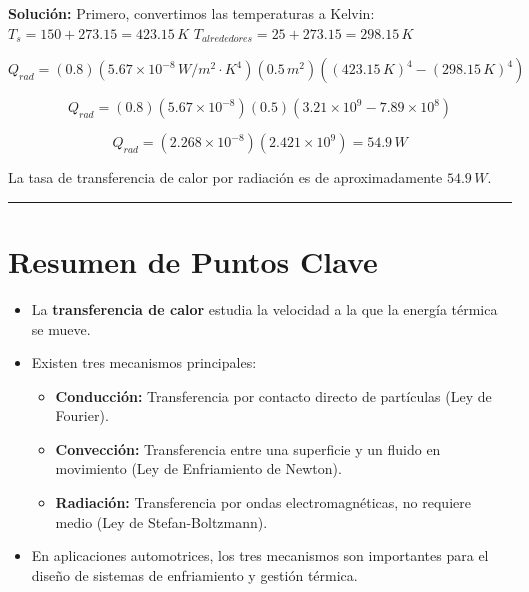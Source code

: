 \documentclass{article}
\begin{document}
\textbf{Solución:}
Primero, convertimos las temperaturas a Kelvin:
$T_s = 150 + 273.15 = 423.15 \, K$
$T_{alrededores} = 25 + 273.15 = 298.15 \, K$

$$ Q_{rad} = (0.8)(5.67 \times 10^{-8} \, W/m^2 \cdot K^4)(0.5 \, m^2) ((423.15 \, K)^4 - (298.15 \, K)^4) $$

$$ Q_{rad} = (0.8)(5.67 \times 10^{-8})(0.5) (3.21 \times 10^9 - 7.89 \times 10^8) $$

$$ Q_{rad} = (2.268 \times 10^{-8}) (2.421 \times 10^9) = 54.9 \, W $$

La tasa de transferencia de calor por radiación es de aproximadamente $54.9 \, W$.

\vspace{5mm}
\hrule
\vspace{5mm}

\section*{Resumen de Puntos Clave}

\begin{itemize}
    \item La \textbf{transferencia de calor} estudia la velocidad a la que la energía térmica se mueve.
    \item Existen tres mecanismos principales:
    \begin{itemize}
        \item \textbf{Conducción:} Transferencia por contacto directo de partículas (Ley de Fourier).
        \item \textbf{Convección:} Transferencia entre una superficie y un fluido en movimiento (Ley de Enfriamiento de Newton).
        \item \textbf{Radiación:} Transferencia por ondas electromagnéticas, no requiere medio (Ley de Stefan-Boltzmann).
    \end{itemize}
    \item En aplicaciones automotrices, los tres mecanismos son importantes para el diseño de sistemas de enfriamiento y gestión térmica.
\end{itemize}
\end{document}
